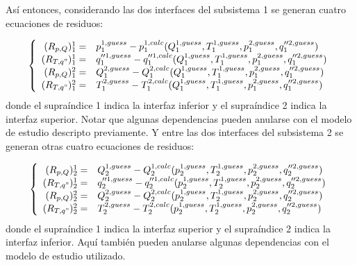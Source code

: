 Así entonces, considerando las dos interfaces del subsistema 1 se generan cuatro ecuaciones de residuos:

\begin{equation}
\left\{ \begin{array}{rl}
(R_{p,Q})_{1}^{1}  =& p_1^{1, guess} - p_1^{1, calc}(Q_1^{1, guess}, T_1^{1, guess}, p_1^{2, guess}, q_1''^{2, guess}) \\
(R_{T,q"})_{1}^{1} =& q_{1}''^{1, guess} - q_{1}''^{1, calc}(Q_1^{1, guess}, T_1^{1, guess}, p_1^{2, guess}, q_1''^{2, guess}) \\
(R_{p,Q})_{1}^{2}  =& Q_1^{2, guess} - Q_1^{2, calc}(Q_1^{1, guess}, T_1^{1, guess}, p_1^{2, guess}, q_1''^{2, guess}) \\
(R_{T,q"})_{1}^{2} =& T_1^{2, guess} - T_1^{2, calc}(Q_1^{1, guess}, T_1^{1, guess}, p_1^{2, guess}, q_1''^{2, guess})
\end{array}
\right.
\label{residuos-1}
\end{equation}
donde el supraíndice 1 indica la interfaz inferior y el supraíndice 2 indica la interfaz superior.
Notar que algunas dependencias pueden anularse con el modelo de estudio descripto previamente.
Y entre las dos interfaces del subsistema 2 se generan otras cuatro ecuaciones de residuos:

\begin{equation}
\left\{ \begin{array}{rl}
(R_{p,Q})_{2}^{1}  =& Q_2^{1, guess} - Q_2^{1, calc}(p_2^{1, guess}, T_2^{1, guess}, p_2^{2, guess}, q_2''^{2, guess}) \\
(R_{T,q"})_{2}^{1} =& q_{2}''^{1, guess} - q_{2}''^{1, calc}(p_2^{1, guess}, T_2^{1, guess}, p_2^{2, guess}, q_2''^{2, guess}) \\
(R_{p,Q})_{2}^{2}  =& Q_2^{2, guess} - Q_2^{2, calc}(p_2^{1, guess}, T_2^{1, guess}, p_2^{2, guess}, q_2''^{2, guess})  \\
(R_{T,q"})_{2}^{2} =& T_2^{2, guess} - T_2^{2, calc}(p_2^{1, guess}, T_2^{1, guess}, p_2^{2, guess}, q_2''^{2, guess}) 
\end{array}
\right.
\label{residuos-2}
\end{equation}
donde el supraíndice 1 indica la interfaz superior y el supraíndice 2 indica la interfaz inferior.
Aquí también pueden anularse algunas dependencias con el modelo de estudio utilizado.

